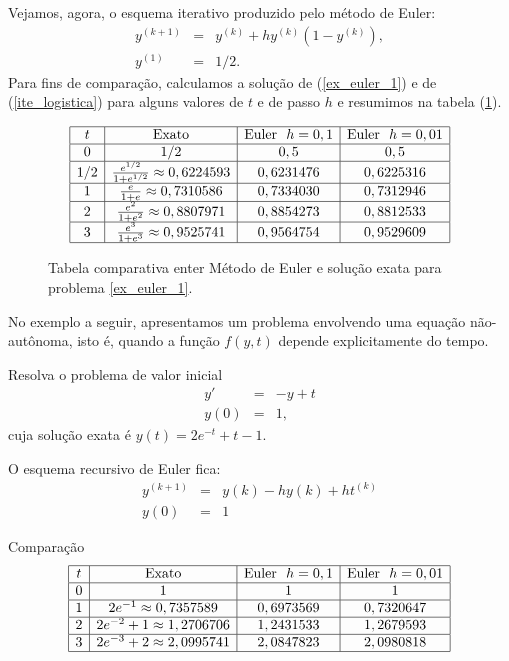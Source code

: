 Vejamos, agora, o esquema iterativo produzido pelo método de Euler:
\begin{subequations}\label{ite_logistica}
\begin{eqnarray}
y^{(k+1)}&=&y^{(k)}+h y^{(k)}(1-y^{(k)}),\\
y^{(1)}&=&1/2.
\end{eqnarray}
\end{subequations}
Para fins de comparação, calculamos a solução de (\ref{ex_euler_1}) e de (\ref{ite_logistica}) para alguns valores de $t$ e de passo $h$ e resumimos na tabela (\ref{tab_logistica}).
\begin{figure}[htp]\label{tab_logistica}\caption{Tabela comparativa enter Método de Euler e solução exata para problema \ref{ex_euler_1}.}
 $$\begin{array}{|c|c|c|c|}
\hline
t &  \hbox{Exato} & \hbox{Euler}~~ h=0,1 & \hbox{Euler}~~ h=0,01\\
\hline
0 &  1/2 & 0,5 & 0,5\\
\hline
1/2 &   \frac{e^{1/2}}{1+e^{1/2}}\approx 0,6224593 & 0,6231476 & 0,6225316\\
\hline
1 &   \frac{e}{1+e}\approx 0,7310586 & 0,7334030 & 0,7312946\\
\hline
2 &   \frac{e^2}{1+e^2}\approx  0,8807971 & 0,8854273  & 0,8812533 \\
\hline
3 &   \frac{e^3}{1+e^3}\approx   0,9525741   & 0,9564754   & 0,9529609 \\
\hline
\end{array}
$$
\end{figure}

No exemplo a seguir, apresentamos um problema envolvendo uma equação não-autônoma, isto é, quando a função $f(y,t)$ depende explicitamente do tempo.

\begin{ex} Resolva o problema de valor inicial
\begin{eqnarray*}
y'&=&-y+t\\
y(0)&=&1,
\end{eqnarray*}
cuja solução exata é $y(t)=2e^{-t}+t-1$.
\end{ex}
O esquema recursivo de Euler fica:
\begin{eqnarray*}
y^{(k+1)}&=&y({k})- hy({k})+ht^{(k)}\\
y(0)&=&1
\end{eqnarray*}

Comparação
$$\begin{array}{|c|c|c|c|}
\hline
t &  \hbox{Exato} & \hbox{Euler}~~ h=0,1 & \hbox{Euler}~~ h=0,01\\
\hline
0 &  1 & 1 & 1\\
\hline
1 &   2e^{-1}\approx 0,7357589 & 0,6973569   &   0,7320647  \\
\hline
2 &   2e^{-2}+1\approx  1,2706706 &  1,2431533    &   1,2679593     \\
\hline
3 &   2e^{-3}+2\approx 2,0995741  &  2,0847823 & 2,0980818   \\
\hline
\end{array}
$$

